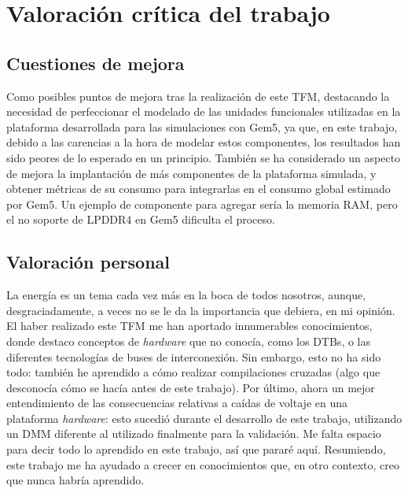 \section{Valoración crítica del trabajo}

\subsection{Cuestiones de mejora}

Como posibles puntos de mejora tras la realización de este \ac{TFM}, destacando la necesidad de perfeccionar el modelado de las unidades funcionales utilizadas en la plataforma desarrollada para las simulaciones con Gem5, ya que, en este trabajo, debido a las carencias a la hora de modelar estos componentes, los resultados han sido peores de lo esperado en un principio. También se ha considerado un aspecto de mejora la implantación de más componentes de la plataforma simulada, y obtener métricas de su consumo para integrarlas en el consumo global estimado por Gem5. Un ejemplo de componente para agregar sería la memoria \ac{RAM}, pero el no soporte de \ac{LPDDR4} en Gem5 dificulta el proceso.

\subsection{Valoración personal}

La energía es un tema cada vez más en la boca de todos nosotros, aunque, desgraciadamente, a veces no se le da la importancia que debiera, en mi opinión. El haber realizado este \ac{TFM} me han aportado innumerables conocimientos, donde destaco conceptos de \textit{hardware} que no conocía, como los DTBs, o las diferentes tecnologías de buses de interconexión. Sin embargo, esto no ha sido todo: también he aprendido a cómo realizar compilaciones cruzadas (algo que desconocía cómo se hacía antes de este trabajo). Por último, ahora un mejor entendimiento de las consecuencias relativas a caídas de voltaje en una plataforma \textit{hardware}: esto sucedió durante el desarrollo de este trabajo, utilizando un DMM diferente al utilizado finalmente para la validación. Me falta espacio para decir todo lo aprendido en este trabajo, así que pararé aquí. Resumiendo, este trabajo me ha ayudado a crecer en conocimientos que, en otro contexto, creo que nunca habría aprendido.